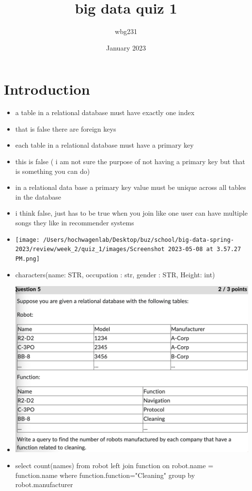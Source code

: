 \documentclass{article}
\title{big data quiz 1 }
\author{wbg231 }
\date{January 2023}
\begin{document}
\maketitle

\section{Introduction}
\begin{itemize}
    \item a table in a relational database must have exactly one index 
    \item that is false there are foreign keys 
    \item each table in a relational database must have a primary key 
    \item this is false  ( i am not sure the purpose of not having a primary key but that is something you can do)
    \item in a relational data base a primary key value must be unique across all tables in the database 
    \item i think false, just has to be true when you join like one user can have multiple songs they like in recommender systems
    \item \texttt{[image: /Users/hochwagenlab/Desktop/buz/school/big-data-spring-2023/review/week\_2/quiz\_1/images/Screenshot 2023-05-08 at 3.57.27 PM.png]}
    \item characters(name: STR, occupation : str, gender : STR, Height: int)
    \item \includegraphics{images/Screenshot 2023-05-08 at 4.01.12 PM.png}
    \item select count(names) from robot left join function on robot.name = function.name where function.function="Cleaning" group by robot.manufacturer
\end{itemize}
\end{document}
